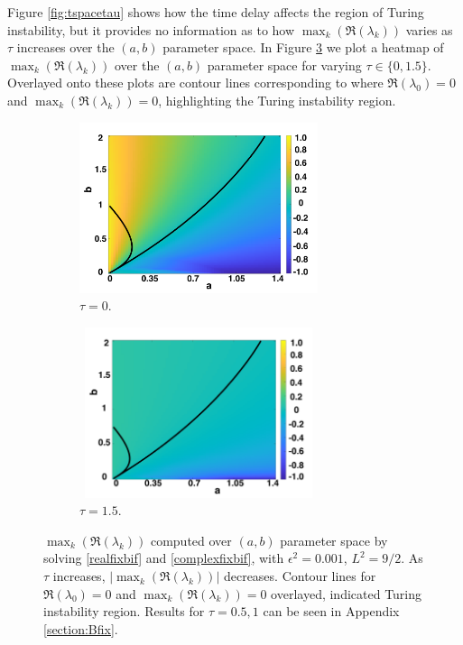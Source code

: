 Figure \ref{fig:tspacetau} shows how the time delay affects the region of Turing instability, but it provides no information as to how $\max_k(\Re(\lambda_k))$ varies as $\tau$ increases over the $(a,b)$ parameter space. In Figure \ref{fig:lambdavary} we plot a heatmap of $\max_k(\Re(\lambda_k))$ over the $(a,b)$ parameter space for varying $\tau\in\{0,1.5\}$. Overlayed onto these plots are contour lines corresponding to where $\Re(\lambda_0)=0$ and $\max_k(\Re(\lambda_k))=0$,
highlighting the Turing instability region.
\begin{figure}[H]
    \centering
    \begin{subfigure}[t]{0.45\textwidth}
        \centering
        \includegraphics[width=7cm,height=5cm]{tau0bif.png}
        \caption{$\tau=0$.}
        \label{}
    \end{subfigure}
    \hfill
    \begin{subfigure}[t]{0.45\textwidth}
        \centering
        \includegraphics[width=7cm,height=5cm]{tau15bif.png}
        \caption{$\tau=1.5$.}
        \label{}
    \end{subfigure}
    \caption{$\max_k(\Re(\lambda_k))$ computed over $(a,b)$ parameter space by solving \eqref{realfixbif} and \eqref{complexfixbif}, with $\epsilon^2=0.001$, $L^2=9/2$. As $\tau$ increases, $|\max_k(\Re(\lambda_k))|$ decreases. Contour lines for $\Re(\lambda_0)=0$ and $\max_k(\Re(\lambda_k))=0$ overlayed, indicated Turing instability region. Results for $\tau=0.5,1$ can be seen in Appendix \ref{section:Bfix}.}
    \label{fig:lambdavary}
\end{figure}
